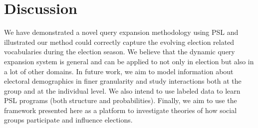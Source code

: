 \section{Discussion}
We have demonstrated a novel query expansion methodology using PSL and illustrated our method could correctly capture the evolving election related vocabularies during the election season.
We believe that the dynamic query expansion system is general and can be applied to not only in election but also in a lot of other domains. In future work, we aim to model information about electoral demographics in finer granularity and study interactions both at the group and at the individual level. We also intend to use labeled data to learn
PSL programs (both structure and probabilities). Finally, we aim to use the framework presented
here as a platform to investigate theories of how social groups participate and influence elections.

